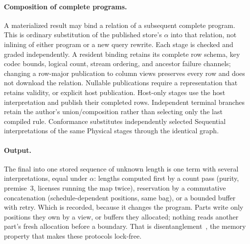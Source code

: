\paragraph{Composition of complete programs.}
A materialized result may bind a relation of a subsequent complete program.
This is ordinary substitution of the published store's $\alpha$ into that
relation, not inlining of either program or a new query rewrite. Each stage
is checked and graded independently. A resident binding retains its complete
row schema, key codec bounds, logical count, stream ordering, and ancestor failure channels;
changing a row-major publication to column views preserves every row and
does not download the relation. Nullable publications require a representation
that retains validity, or explicit host publication. Host-only stages use the
host interpretation and publish their completed rows. Independent terminal
branches retain the author's union/composition rather than selecting only the
last compiled rule. Conformance substitutes independently selected Sequential
interpretations of the same Physical stages through the identical graph.

\paragraph{Output.} The final  into one stored sequence of
unknown length is one term with several interpretations, equal under
$\alpha$: lengths computed first by a count pass (purity, premise~3,
licenses running the map twice), reservation by a commutative concatenation
(schedule-dependent positions, same bag), or a bounded buffer with retry.
Which is recorded, because it changes the program. Parts write only
positions they own by a view, or buffers they allocated; nothing reads
another part's fresh allocation before a boundary. That is
disentanglement~\cite{paper-disentangle}, the memory property that makes
these protocols lock-free.

